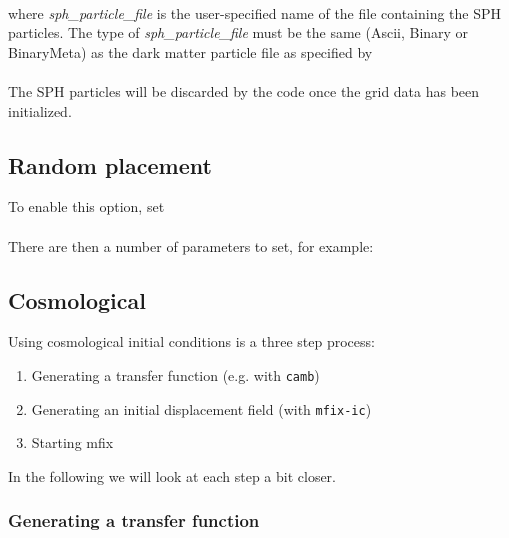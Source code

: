  \\

\noindent where {\em sph\_particle\_file} is the user-specified name of the file
containing the SPH particles.  The type of {\em sph\_particle\_file} 
must be the same (Ascii, Binary or BinaryMeta) as the dark matter particle 
file as specified by   \\

 \\

\noindent The SPH particles will be discarded by the code once the grid data has been initialized.

\subsection{Random placement}

To enable this option, set \\

 \\

\noindent There are then a number of parameters to set, for example: \\




\subsection{Cosmological}

Using cosmological initial conditions is a three step process:
\begin{enumerate}
	\item Generating a transfer function (e.g. with \texttt{camb})
	\item Generating an initial displacement field (with \texttt{mfix-ic})
	\item Starting mfix
\end{enumerate}

In the following we will look at each step a bit closer.

\subsubsection{Generating a transfer function}

